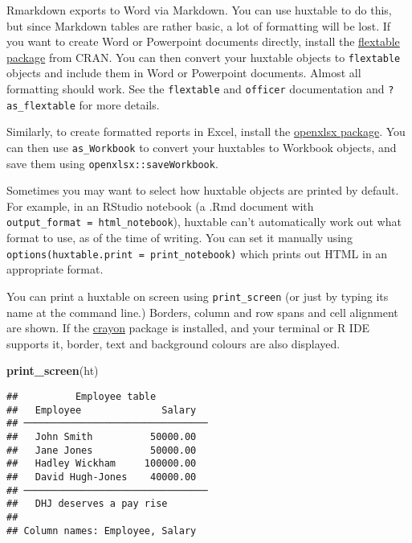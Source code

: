 \documentclass[]{article}
\newenvironment{Shaded}{\begin{snugshade}}{\end{snugshade}}
\newcommand{\KeywordTok}[1]{\textcolor[rgb]{0.13,0.29,0.53}{\textbf{#1}}}
\newcommand{\NormalTok}[1]{#1}
\begin{document}
Rmarkdown exports to Word via Markdown. You can use huxtable to do this,
but since Markdown tables are rather basic, a lot of formatting will be
lost. If you want to create Word or Powerpoint documents directly,
install the
\href{https://cran.r-project.org/package=flextable}{flextable package}
from CRAN. You can then convert your huxtable objects to
\texttt{flextable} objects and include them in Word or Powerpoint
documents. Almost all formatting should work. See the \texttt{flextable}
and \texttt{officer} documentation and \texttt{?as\_flextable} for more
details.

Similarly, to create formatted reports in Excel, install the
\href{https://cran.r-project.org/package=openxlsx}{openxlsx package}.
You can then use \texttt{as\_Workbook} to convert your huxtables to
Workbook objects, and save them using \texttt{openxlsx::saveWorkbook}.

Sometimes you may want to select how huxtable objects are printed by
default. For example, in an RStudio notebook (a .Rmd document with
\texttt{output\_format\ =\ html\_notebook}), huxtable can't
automatically work out what format to use, as of the time of writing.
You can set it manually using
\texttt{options(huxtable.print\ =\ print\_notebook)} which prints out
HTML in an appropriate format.

You can print a huxtable on screen using \texttt{print\_screen} (or just
by typing its name at the command line.) Borders, column and row spans
and cell alignment are shown. If the
\href{https://cran.r-project.org/package=crayon}{crayon} package is
installed, and your terminal or R IDE supports it, border, text and
background colours are also displayed.

\begin{Shaded}
\begin{Highlighting}[]
\KeywordTok{print_screen}\NormalTok{(ht)}
\end{Highlighting}
\end{Shaded}

\begin{verbatim}
##          Employee table         
##   Employee              Salary  
## ────────────────────────────────
##   John Smith          50000.00  
##   Jane Jones          50000.00  
##   Hadley Wickham     100000.00  
##   David Hugh-Jones    40000.00  
## ────────────────────────────────
##   DHJ deserves a pay rise       
## 
## Column names: Employee, Salary
\end{verbatim}

\FloatBarrier
\end{document}
